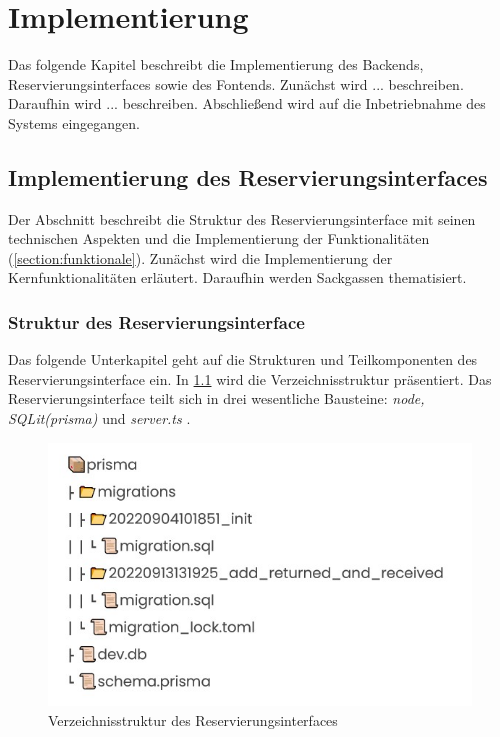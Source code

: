 
\chapter{Implementierung}
\label{chapter-implementierung}
Das folgende Kapitel beschreibt die Implementierung des Backends, Reservierungsinterfaces sowie des
Fontends. Zunächst wird ... beschreiben. Daraufhin wird ... beschreiben. Abschließend wird auf die
Inbetriebnahme des Systems eingegangen.


\section{Implementierung des Reservierungsinterfaces}
Der Abschnitt beschreibt die Struktur des Reservierungsinterface mit seinen technischen Aspekten
und die Implementierung der Funktionalitäten (\ref{section:funktionale}). Zunächst wird die
Implementierung der Kernfunktionalitäten erläutert. Daraufhin werden Sackgassen thematisiert.


\subsection{Struktur des Reservierungsinterface}
Das folgende Unterkapitel geht auf die Strukturen und Teilkomponenten des Reservierungsinterface
ein. In \ref{fig:db} wird die Verzeichnisstruktur präsentiert. Das Reservierungsinterface teilt sich
in drei wesentliche Bausteine: \textit{node, SQLit(prisma)} und \textit{server.ts} . 

\begin{figure}[h]
  \centering
  \includegraphics[scale=0.7]{Bilder/Db.jpg}
  \caption[Verzeichnisstruktur des Reservierungsinterfaces]{Verzeichnisstruktur des Reservierungsinterfaces}
  \label{fig:db}
\end{figure}

